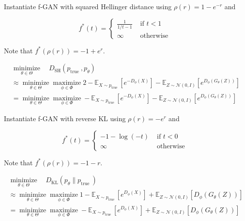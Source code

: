 \documentclass{report}
\begin{document}
\begin{concept}
    Instantiate f-GAN with squared Hellinger distance using $\rho(r)=1-e^{-r}$ and

    $$
    f^{*}(t)= \begin{cases}\frac{1}{1 / t-1} & \text { if } t<1 \\ \infty & \text { otherwise }\end{cases}
    $$

    Note that $f^{*}(\rho(r))=-1+e^{r}$.

    $$
    \begin{gathered}
    \underset{\theta \in \Theta}{\operatorname{minimize}} \quad D_{\mathrm{SH}}\left(p_{\text {true }}, p_{\theta}\right) \\
    \approx \underset{\theta \in \Theta}{\operatorname{minimize}} \underset{\phi \in \Phi}{\operatorname{maximize}} 2-\mathbb{E}_{X \sim p_{\text {true }}}\left[e^{-D_{\phi}(X)}\right]-\mathbb{E}_{Z \sim \mathcal{N}(0, I)}\left[e^{D_{\phi}\left(G_{\theta}(Z)\right)}\right] \\
    = \underset{\theta \in \Theta}{\operatorname{minimize}} \underset{\phi \in \Phi}{\operatorname{maximize}} -\mathbb{E}_{X \sim p_{\text {true }}}\left[e^{-D_{\phi}(X)}\right]-\mathbb{E}_{Z \sim \mathcal{N}(0, I)}\left[e^{D_{\phi}\left(G_{\theta}(Z)\right)}\right]
    \end{gathered}
    $$
\end{concept}

\begin{concept}
    Instantiate f-GAN with reverse KL using $\rho(r)=-e^{r}$ and

    $$
    f^{*}(t)= \begin{cases}-1-\log (-t) & \text { if } t<0 \\ \infty & \text { otherwise }\end{cases}
    $$

    Note that $f^{*}(\rho(r))=-1-r$.

    $$
    \begin{gathered}
    \underset{\theta \in \Theta}{\operatorname{minimize}} \quad D_{\mathrm{KL}}\left(p_{\theta} \| p_{\text {true }}\right) \\
    \approx \underset{\theta \in \Theta}{\operatorname{minimize}} \underset{\phi \in \Phi}{\operatorname{maximize}} 1-\mathbb{E}_{X \sim p_{\text {true }}}\left[e^{D_{\phi}(X)}\right]+\mathbb{E}_{Z \sim \mathcal{N}(0, I)}\left[D_{\phi}\left(G_{\theta}(Z)\right)\right] \\
    =\underset{\theta \in \Theta}{\operatorname{minimize}} \underset{\phi \in \Phi}{\operatorname{maximize}}-\mathbb{E}_{X \sim p_{\text {true }}}\left[e^{D_{\phi}(X)}\right]+\mathbb{E}_{Z \sim \mathcal{N}(0, I)}\left[D_{\phi}\left(G_{\theta}(Z)\right)\right]
    \end{gathered}
    $$
\end{concept}
\end{document}
